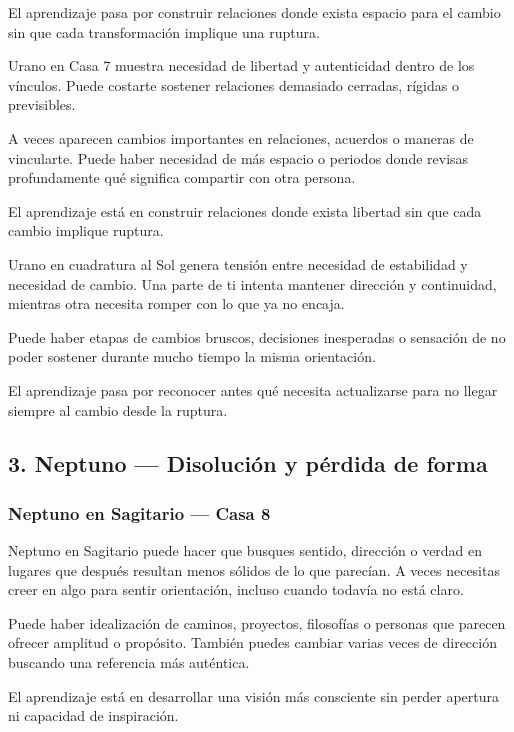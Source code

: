 \documentclass[11pt,a4paper]{article}
\begin{document}
El aprendizaje pasa por construir relaciones donde exista espacio para el cambio sin que cada transformación implique una ruptura.

Urano en Casa 7 muestra necesidad de libertad y autenticidad dentro de los vínculos. Puede costarte sostener relaciones demasiado cerradas, rígidas o previsibles.

A veces aparecen cambios importantes en relaciones, acuerdos o maneras de vincularte. Puede haber necesidad de más espacio o periodos donde revisas profundamente qué significa compartir con otra persona.

El aprendizaje está en construir relaciones donde exista libertad sin que cada cambio implique ruptura.

Urano en cuadratura al Sol genera tensión entre necesidad de estabilidad y necesidad de cambio. Una parte de ti intenta mantener dirección y continuidad, mientras otra necesita romper con lo que ya no encaja.

Puede haber etapas de cambios bruscos, decisiones inesperadas o sensación de no poder sostener durante mucho tiempo la misma orientación.

El aprendizaje pasa por reconocer antes qué necesita actualizarse para no llegar siempre al cambio desde la ruptura.

\vspace{0.8cm}

\subsection{3. Neptuno — Disolución y pérdida de forma}

\subsubsection*{Neptuno en Sagitario — Casa 8}

Neptuno en Sagitario puede hacer que busques sentido, dirección o verdad en lugares que después resultan menos sólidos de lo que parecían. A veces necesitas creer en algo para sentir orientación, incluso cuando todavía no está claro.

Puede haber idealización de caminos, proyectos, filosofías o personas que parecen ofrecer amplitud o propósito. También puedes cambiar varias veces de dirección buscando una referencia más auténtica.

El aprendizaje está en desarrollar una visión más consciente sin perder apertura ni capacidad de inspiración.
\end{document}
